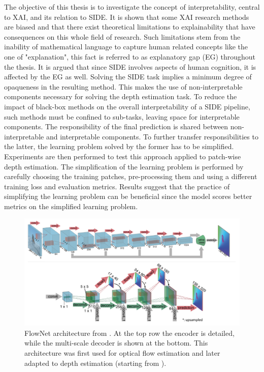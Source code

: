 The objective of this thesis is to investigate the concept of interpretability, central to XAI, and its relation to SIDE.
It is shown that some XAI research methods are biased and that there exist theoretical limitations to explainability that have consequences on this whole field of research.
Such limitations stem from the inability of mathematical language to capture human related concepts like the one of "explanation", this fact is referred to as explanatory gap (EG) throughout the thesis.
It is argued that since SIDE involves aspects of human cognition, it is affected by the EG as well.
Solving the SIDE task implies a minimum degree of opaqueness in the resulting method.
This makes the use of non-interpretable components necessary for solving the depth estimation task.
To reduce the impact of black-box methods on the overall interpretability of a SIDE pipeline, such methods must be confined to sub-tasks, leaving space for interpretable components.
The responsibility of the final prediction is shared between non-interpretable and interpretable components.
To further transfer responsibilities to the latter, the learning problem solved by the former has to be simplified.
Experiments are then performed to test this approach applied to patch-wise depth estimation.
The simplification of the learning problem is performed by carefully choosing the training patches, pre-processing them and using a different training loss and evaluation metrics.
Results suggest that the practice of simplifying the learning problem can be beneficial since the model scores better metrics on the simplified learning problem.

\begin{figure}
    \begin{adjustwidth}{-0.2\textwidth}{-0.2\textwidth}
    \centering
    \includegraphics[scale=0.4]{figs/flow_net}
    \end{adjustwidth}
    \caption{
        FlowNet architecture from \cite{FlowNet}.
        At the top row the encoder is detailed, while the multi-scale decoder is shown at the bottom.
        This architecture was first used for optical flow estimation and later adapted to depth estimation (starting from \cite{DispNet}).
        \label{fig:flow_net}    
    }
\end{figure}

